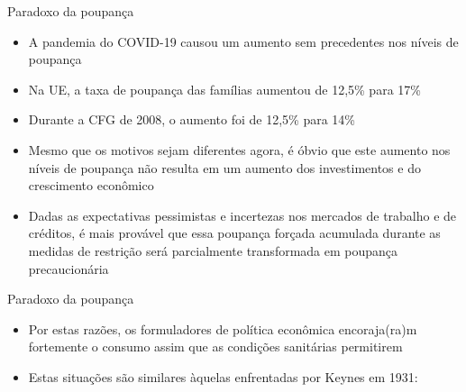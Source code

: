 \documentclass[10pt]{beamer}
\begin{document}
\begin{frame}{Paradoxo da poupança}
    \begin{itemize}
        \item A pandemia do COVID-19 causou um aumento sem precedentes nos níveis de poupança
        \bigskip
        \item Na UE, a taxa de poupança das famílias aumentou de 12,5\% para 17\%
        \bigskip
        \item Durante a CFG de 2008, o aumento foi de 12,5\% para 14\%
        \bigskip
        \item Mesmo que os motivos sejam diferentes agora, é óbvio que este aumento nos níveis de poupança não resulta em um aumento dos investimentos e do crescimento econômico
        \bigskip
        \item Dadas as expectativas pessimistas e incertezas nos mercados de trabalho e de créditos, é mais provável que essa poupança forçada acumulada durante as medidas de restrição será parcialmente transformada em poupança precaucionária
    \end{itemize}
\end{frame}

\begin{frame}{Paradoxo da poupança}
    \begin{itemize}
        \item Por estas razões, os formuladores de política econômica encoraja(ra)m fortemente o consumo assim que as condições sanitárias permitirem
        \bigskip
        \item Estas situações são similares àquelas enfrentadas por Keynes em 1931:
    \end{itemize}
\end{frame}
\end{document}
